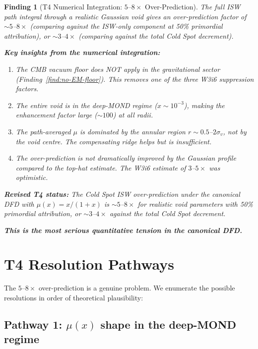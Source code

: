 \documentclass[11pt]{article}
\newtheorem{finding}{Finding}
\newcommand{\mufd}{\mu}
\begin{document}
\begin{finding}[T4 Numerical Integration: $5$--$8\times$ Over-Prediction]
\label{find:T4-numerical}
The full ISW path integral through a realistic Gaussian void gives an
over-prediction factor of $\sim 5$--$8\times$ (comparing against the
ISW-only component at 50\% primordial attribution), or $\sim 3$--$4\times$
(comparing against the total Cold Spot decrement).

\textbf{Key insights from the numerical integration:}
\begin{enumerate}[nosep]
\item The CMB vacuum floor does NOT apply in the gravitational sector
  (Finding~\ref{find:no-EM-floor}). This removes one of the three W3i6
  suppression factors.
\item The entire void is in the deep-MOND regime ($x \sim 10^{-3}$),
  making the enhancement factor large ($\sim 100$) at all radii.
\item The path-averaged $\mufd$ is dominated by the annular region
  $r \sim 0.5$--$2\sigma_v$, not by the void centre. The compensating
  ridge helps but is insufficient.
\item The over-prediction is \emph{not} dramatically improved by the
  Gaussian profile compared to the top-hat estimate. The W3i6 estimate
  of $3$--$5\times$ was optimistic.
\end{enumerate}

\textbf{Revised T4 status:} The Cold Spot ISW over-prediction under
the canonical DFD with $\mufd(x) = x/(1+x)$ is $\sim 5$--$8\times$
for realistic void parameters with 50\% primordial attribution, or
$\sim 3$--$4\times$ against the total Cold Spot decrement.

\textbf{This is the most serious quantitative tension in the canonical DFD.}
\end{finding}

\section{T4 Resolution Pathways}
\label{sec:T4-resolution}

The $5$--$8\times$ over-prediction is a genuine problem. We enumerate
the possible resolutions in order of theoretical plausibility:

\subsection{Pathway 1: $\mufd(x)$ shape in the deep-MOND regime}
\end{document}
